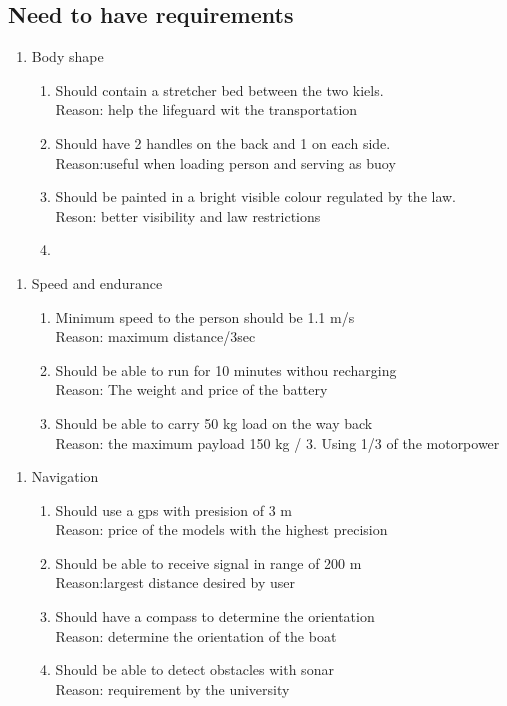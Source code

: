 \subsection{Need to have requirements}
\begin {enumerate}
\item Body shape 
    \begin {enumerate}
    \item Should contain a stretcher bed between the two kiels. 
    \\Reason: help the lifeguard wit the transportation
    \item Should have 2 handles on the back and 1 on each side.
    \\Reason:useful when loading person and serving as buoy 
    \item Should be painted in a bright visible colour regulated by the law.
    \\Reson: better visibility and law restrictions
    \item 
    \end {enumerate}
\end {enumerate}
\begin {enumerate}
\item Speed and endurance 
    \begin {enumerate}
    \item Minimum speed to the person should be 1.1 m/s
    \\Reason: maximum distance/3sec
    \item Should be able to run for 10 minutes withou recharging
    \\Reason: The weight and price of the battery
    \item Should be able to carry 50 kg load on the way back
    \\ Reason: the maximum payload 150 kg / 3. Using 1/3 of the motorpower
    \end {enumerate}
\end {enumerate}
\begin {enumerate}
\item Navigation 
    \begin {enumerate}
    \item Should use a gps with presision of 3 m 
    \\Reason: price of the models with the highest precision
    \item Should be able to receive signal in range of 200 m
    \\Reason:largest distance desired by user
    \item Should have a compass to determine the orientation 
    \\Reason: determine the orientation of the boat
    \item Should be able to detect obstacles with sonar
    \\ Reason: requirement by the university
    \end {enumerate}
\end {enumerate}

